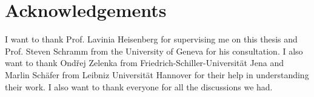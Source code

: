 \documentclass[12pt]{article}
\begin{document}
\maketitle





%

\section{Acknowledgements}

I want to thank Prof. Lavinia Heisenberg for supervising me on this thesis and 
Prof. Steven Schramm from the University of Geneva for his consultation. I also
want to thank Ondřej Zelenka from Friedrich-Schiller-Universität Jena and Marlin
Schäfer from Leibniz Universität Hannover for their help in understanding their
work. I also want to thank everyone for all the discussions we had.

\newpage

\printbibliography %


\end{document}
